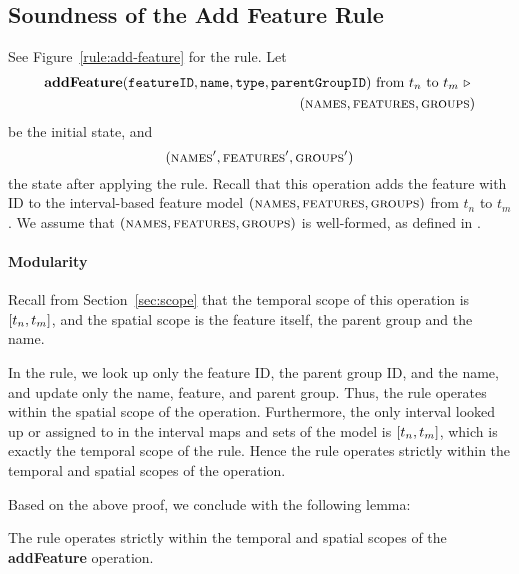 \subsection{Soundness of the Add Feature Rule}
\label{sub:soundness-of-the-add-feature-rule}

See Figure~\vref{rule:add-feature} for the  rule.
Let 
\begin{equation*}
   \begin{split}
      \textbf{addFeature}(\texttt{featureID}, \texttt{name}, \texttt{type}, \texttt{parentGroupID})\text{ from } t_n \text{ to } t_m
      \ \triangleright \  \\
   (\textsc{names}{}, \textsc{features}{}, \textsc{groups}{}{})
\end{split}
\end{equation*}
be the initial state, and
\[
   (\textsc{names}', \textsc{features}', \textsc{groups}{}')
\]
the state after applying the  rule.  Recall that this operation adds the feature with ID  to the interval-based feature model $(\textsc{names}{}, \textsc{features}{}, \textsc{groups}{}{})$ from $t_n$ to $t_m$. We assume that $(\textsc{names}{}, \textsc{features}{}, \textsc{groups}{}{})$ is well-formed, as defined in .

\paragraph{Modularity}

Recall from Section~\vref{sec:scope} that the temporal scope of this operation is $\interval{t_n}{t_m}$, and the spatial scope is the feature itself, the parent group and the name. 

In the rule, we look up only the feature ID, the parent group ID, and the name, and update only the name, feature, and parent group. Thus, the rule operates within the spatial scope of the operation. Furthermore, the only interval looked up or assigned to in the interval maps and sets of the model is $\interval{t_n}{t_m}$, which is exactly the temporal scope of the rule. Hence the rule operates strictly within the temporal and spatial scopes of the operation. 

Based on the above proof, we conclude with the following lemma:
\\

\begin{lemma}
   The  rule operates strictly within the temporal and spatial scopes of the \textbf{addFeature} operation.
   \label{lemma:add-feature-scope}
\end{lemma}


